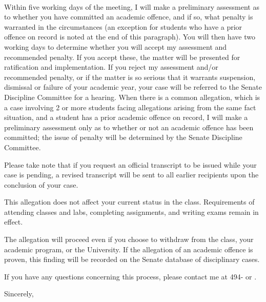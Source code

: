 \documentclass[11pt]{dalcsletter}
\begin{document}
\begin{letter}{ \Student\\ \Address}
Within five working days of the meeting, I will make a preliminary
assessment as to whether you have committed an academic offence,
and if so, what penalty is warranted in the circumstances (an
exception for students who have a prior offence on record is noted
at the end of this paragraph). You will then have two working days
to determine whether you will accept my assessment and recommended
penalty. If you accept these, the matter will be presented for
ratification and implementation. If you reject my assessment and/or
recommended penalty, or if the matter is so serious that it warrants
suspension, dismissal or failure of your academic year, your case
will be referred to the Senate Discipline Committee for a hearing.
When there is a common allegation, which is a case involving 2 or
more students facing allegations arising from the same fact situation,
and a student has a prior academic offence on record, I will make
a preliminary assessment only as to whether or not an academic
offence has been committed; the issue of penalty will be determined
by the Senate Discipline Committee.


Please take note that if you request an official transcript to be
issued while your case is pending, a revised transcript will be
sent to all earlier recipients upon the conclusion of your case.

This allegation does not affect your current status in the class.
Requirements of attending classes and labs, completing assignments,
and writing exams remain in effect.

The allegation will proceed even if you choose to withdraw from the
class, your academic program, or the University. If the allegation
of an academic offence is proven, this finding will be recorded on
the Senate database of disciplinary cases.

If you have any questions concerning this process, please contact
me at 494-\AIOPhoneExt{} or \AIOEmail.

\closing{Sincerely,}

\end{letter}
\end{document}
